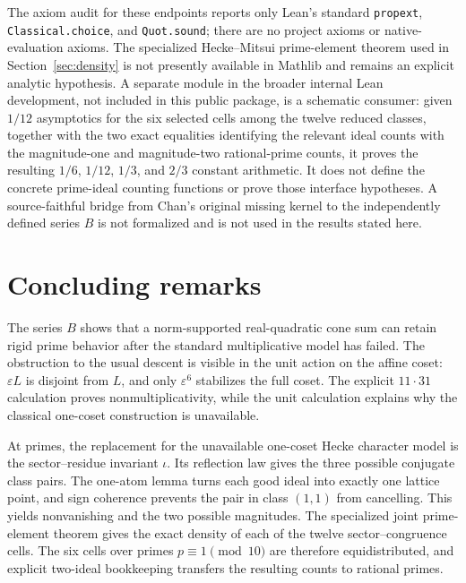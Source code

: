 \documentclass[12pt]{amsart}
\theoremstyle{definition}
\theoremstyle{remark}
\newcommand{\eps}{\varepsilon}
\begin{document}
The axiom audit for these endpoints reports only Lean's standard
\texttt{propext}, \texttt{Classical.\allowbreak choice}, and
\texttt{Quot.\allowbreak sound};
there are no project axioms or native-evaluation axioms.  The
specialized Hecke--Mitsui prime-element theorem used in
Section~\ref{sec:density} is not presently available in Mathlib and
remains an explicit analytic hypothesis.  A separate module in the broader
internal Lean development, not included in this public package, is a
schematic consumer: given $1/12$ asymptotics for the six selected cells
among the twelve reduced classes, together with the two exact equalities
identifying the relevant ideal counts with the magnitude-one and
magnitude-two rational-prime counts, it proves the resulting $1/6$,
$1/12$, $1/3$, and $2/3$ constant arithmetic.  It does not define the
concrete prime-ideal counting functions or prove those interface hypotheses.
A
source-faithful bridge from Chan's original missing kernel to the
independently defined series $B$ is not formalized and is not used in
the results stated here.

\section{Concluding remarks}\label{sec:conclusion}

The series $B$ shows that a norm-supported real-quadratic cone sum can
retain rigid prime behavior after the standard multiplicative model
has failed.  The obstruction to the usual descent is visible in the
unit action on the affine coset: $\eps L$ is disjoint from $L$, and
only $\eps^6$ stabilizes the full coset.  The explicit
$11\cdot31$ calculation proves nonmultiplicativity, while the unit
calculation explains why the classical one-coset construction is
unavailable.

At primes, the replacement for the unavailable one-coset Hecke
character model is the
sector--residue invariant $\iota$.  Its reflection law gives the three
possible conjugate class pairs.  The one-atom lemma turns each
good ideal into exactly one lattice point, and sign coherence prevents
the pair in class $(1,1)$ from cancelling.  This yields nonvanishing
and the two possible magnitudes.  The specialized joint
prime-element theorem gives the exact density of each of the twelve
sector--congruence cells.  The six cells over primes
$p\equiv1\pmod{10}$ are therefore equidistributed, and explicit
two-ideal bookkeeping transfers the resulting counts to rational
primes.



\end{document}
